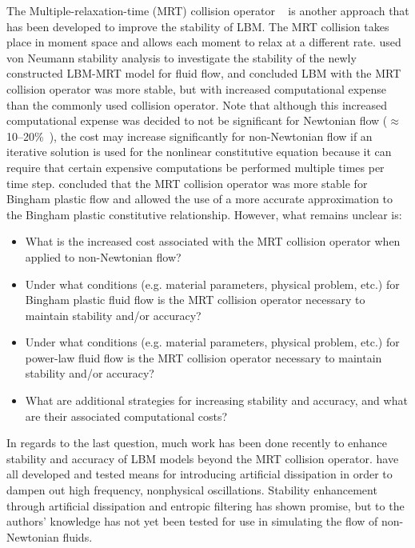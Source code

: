 The Multiple-relaxation-time (MRT) collision operator ~\cite{d1994generalized} is another approach that has been developed to improve the stability of LBM.
The MRT collision takes place in moment space and allows each moment to relax at a different rate.
\cite{lallemand2000theory} used von Neumann stability analysis to investigate the stability of the newly constructed LBM-MRT model for fluid flow, and concluded LBM with the MRT collision operator was more stable, but with increased computational expense than the commonly used collision operator.
Note that although this increased computational expense was decided to not be significant for Newtonian flow ($\approx$ 10--20\%~\cite{lallemand2000theory}), the cost may increase significantly for non-Newtonian flow if an iterative solution is used for the nonlinear constitutive equation because it can require that certain expensive computations be performed multiple times per time step.
\cite{chen2014simulations} concluded that the MRT collision operator was more stable for Bingham plastic flow and allowed the use of a more accurate approximation to the Bingham plastic constitutive relationship.
However, what remains unclear is:
 \begin{itemize} 
    \item What is the increased cost associated with the MRT collision operator when applied to non-Newtonian flow?
    \item Under what conditions (e.g. material parameters, physical problem, etc.) for Bingham plastic fluid flow is the MRT collision operator necessary to maintain stability and/or accuracy?
    \item Under what conditions (e.g. material parameters, physical problem, etc.) for power-law fluid flow is the MRT collision operator necessary to maintain stability and/or accuracy?
    \item What are additional strategies for increasing stability and accuracy, and what are their associated computational costs?
 \end{itemize} 
In regards to the last question, much work has been done recently to enhance stability and accuracy of LBM models beyond the MRT collision operator.
\cite{brownlee2006stabilization,brownlee2007stability,brownlee2008nonequilibrium,packwood2009entropy,gorban2014enhancement} have all developed and tested means for introducing artificial dissipation in order to dampen out high frequency, nonphysical oscillations.
Stability enhancement through artificial dissipation and entropic filtering has shown promise, but to the authors' knowledge has not yet been tested for use in simulating the flow of non-Newtonian fluids.

